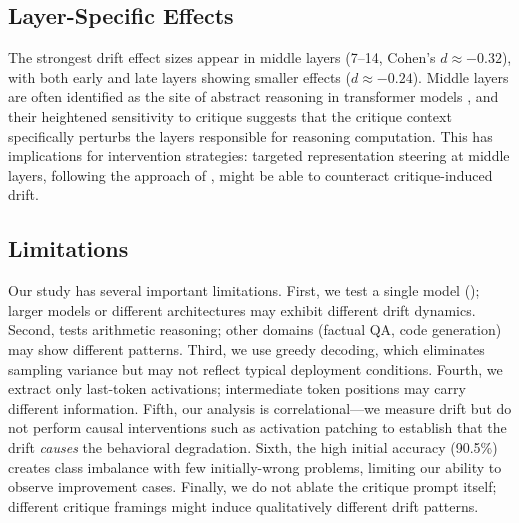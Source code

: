 \subsection{Layer-Specific Effects}

The strongest drift effect sizes appear in middle layers (7--14, Cohen's $d \approx -0.32$), with both early and late layers showing smaller effects ($d \approx -0.24$). Middle layers are often identified as the site of abstract reasoning in transformer models \cite{marks2024geometry}, and their heightened sensitivity to critique suggests that the critique context specifically perturbs the layers responsible for reasoning computation. This has implications for intervention strategies: targeted representation steering at middle layers, following the approach of \citet{zou2023representation}, might be able to counteract critique-induced drift.

\subsection{Limitations}

Our study has several important limitations. First, we test a single model (\qwen); larger models or different architectures may exhibit different drift dynamics. Second, \gsmk tests arithmetic reasoning; other domains (\eg factual QA, code generation) may show different patterns. Third, we use greedy decoding, which eliminates sampling variance but may not reflect typical deployment conditions. Fourth, we extract only last-token activations; intermediate token positions may carry different information. Fifth, our analysis is correlational---we measure drift but do not perform causal interventions such as activation patching to establish that the drift \emph{causes} the behavioral degradation. Sixth, the high initial accuracy (90.5\%) creates class imbalance with few initially-wrong problems, limiting our ability to observe improvement cases. Finally, we do not ablate the critique prompt itself; different critique framings might induce qualitatively different drift patterns.
